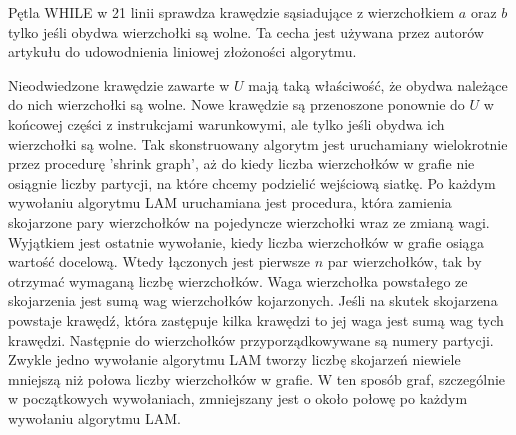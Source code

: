 Pętla WHILE w 21 linii sprawdza krawędzie sąsiadujące z wierzchołkiem $a$ oraz $b$ tylko jeśli obydwa wierzchołki są wolne.
Ta cecha jest używana przez autorów artykułu do udowodnienia liniowej złożoności algorytmu.

Nieodwiedzone krawędzie zawarte w $U$ mają taką właściwość, że obydwa należące do nich wierzchołki są wolne.
Nowe krawędzie są przenoszone ponownie do $U$ w końcowej części z instrukcjami warunkowymi, ale tylko jeśli obydwa ich
wierzchołki są wolne.
Tak skonstruowany algorytm jest uruchamiany wielokrotnie przez procedurę 'shrink graph', aż do kiedy liczba
wierzchołków w grafie nie osiągnie liczby partycji, na które chcemy podzielić wejściową siatkę.
Po każdym wywołaniu algorytmu LAM uruchamiana jest procedura, która zamienia skojarzone pary wierzchołków na pojedyncze
wierzchołki wraz ze zmianą wagi.
Wyjątkiem jest ostatnie wywołanie, kiedy liczba wierzchołków w grafie osiąga wartość docelową.
Wtedy łączonych jest
pierwsze $n$ par wierzchołków, tak by otrzymać wymaganą liczbę wierzchołków.
Waga wierzchołka powstałego ze skojarzenia jest sumą wag wierzchołków kojarzonych.
Jeśli na skutek skojarzena powstaje krawędź,
która zastępuje kilka krawędzi to jej waga jest sumą wag tych krawędzi.
Następnie do wierzchołków przyporządkowywane są numery partycji.
Zwykle jedno wywołanie algorytmu LAM
tworzy liczbę skojarzeń niewiele mniejszą niż połowa liczby wierzchołków w grafie.
W ten sposób graf, szczególnie w początkowych wywołaniach, zmniejszany jest o około połowę po każdym wywołaniu algorytmu LAM.
\vspace{mm}
